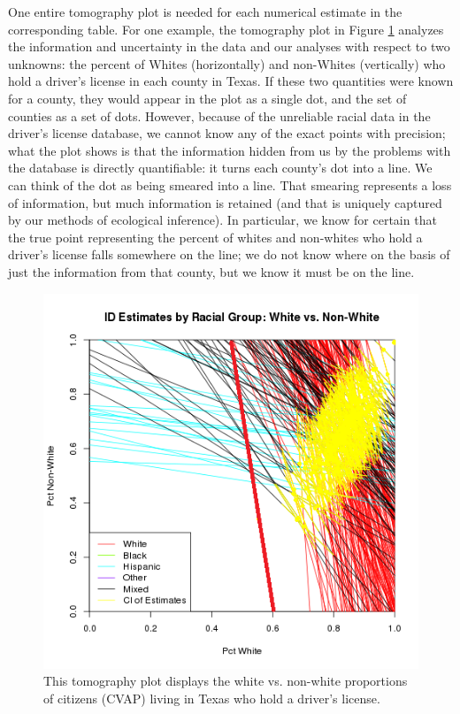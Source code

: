 \documentclass[12pt]{article}
\begin{document}
One entire tomography plot is needed for each numerical estimate in
the corresponding table. For one example, the tomography plot in
Figure \ref{tomog} analyzes the information and uncertainty in the
data and our analyses with respect to two unknowns: the percent of
Whites (horizontally) and non-Whites (vertically) who hold a driver's license in each county in Texas.
If these two
quantities were known for a county, they would appear in the plot as
a single dot, and the set of counties as a set of dots.  However,
because of the unreliable racial data in the driver's license database, we cannot know any of the exact points
with precision; what the plot shows is that the information hidden
from us by the problems with the database is directly quantifiable: it turns each
county's dot into a line.  We can think of the dot as being smeared
into a line. That smearing represents a loss of information, but much
information is retained (and that is uniquely captured by our methods
of ecological inference).  In particular, we know for certain that the
true point representing the percent of whites and non-whites who hold a driver's license
falls somewhere on the line; we do not know
where on the basis of just the information from that county, but we
know it must be on the line.

\begin{figure}[htb]
\begin{centering}
\includegraphics[scale=.75]{figs/CVAP_f3_dl_white_ex.png}
\caption{\label{tomog}This tomography plot displays the white vs. non-white proportions of citizens (CVAP)
living in Texas who hold a driver's license.}
\end{centering}
\end{figure}
\end{document}
